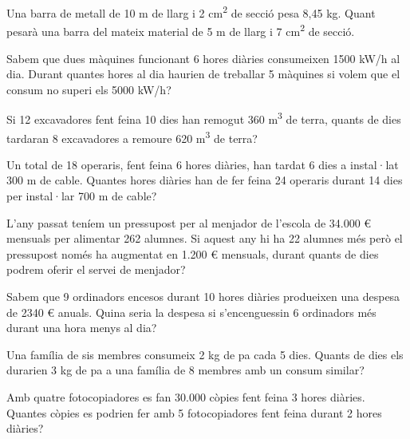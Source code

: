 \documentclass{article}
\newcommand{\vs}{\vspace{0cm}}
\begin{document}
\begin{mylist}
\begin{example}
		\end{example}
	\vs\vs\vs
		\item
		Una barra de metall de 10 m de llarg i 2 cm\textsuperscript{2} de
		secció pesa 8,45 kg. Quant pesarà una barra del mateix material de 5 m
		de llarg i 7 cm\textsuperscript{2} de secció.	\vs
		\item
		Sabem que dues màquines funcionant 6 hores diàries consumeixen 1500
		kW/h al dia. Durant quantes hores al dia haurien de treballar 5
		màquines si volem que el consum no superi els 5000 kW/h?	\vs
		\item
		Si 12 excavadores fent feina 10 dies han remogut 360
		m\textsuperscript{3} de terra, quants de dies tardaran 8 excavadores a
		remoure 620 m\textsuperscript{3} de terra?	\vs
		\item
		Un total de 18 operaris, fent feina 6 hores diàries, han tardat 6 dies
		a instal·lat 300 m de cable. Quantes hores diàries han de fer feina 24
		operaris durant 14 dies per instal·lar 700 m de cable?	\vs
		\item
		L'any passat teníem un pressupost per al menjador de l'escola de
		34.000 \euro{} mensuals per alimentar 262 alumnes. Si aquest any hi ha
		22 alumnes més però el pressupost només ha augmentat en 1.200 \euro{}
		mensuals, durant quants de dies podrem oferir el servei de menjador?	\vs
		\item
		Sabem que 9 ordinadors encesos durant 10 hores diàries produeixen una
		despesa de 2340 \euro{} anuals. Quina seria la despesa si
		s'encenguessin 6 ordinadors més durant una hora menys al dia?	\vs
		\item
		Una família de sis membres consumeix 2 kg de pa cada 5 dies. Quants de
		dies els durarien 3 kg de pa a una família de 8 membres amb un consum
		similar?	\vs
		\item
		Amb quatre fotocopiadores es fan 30.000 còpies fent feina 3 hores
		diàries. Quantes còpies es podrien fer amb 5 fotocopiadores fent feina
		durant 2 hores diàries?	\vs
	\end{mylist}
\end{document}

